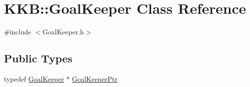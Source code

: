 \hypertarget{class_k_k_b_1_1_goal_keeper}{}\section{K\+KB\+:\+:Goal\+Keeper Class Reference}
\label{class_k_k_b_1_1_goal_keeper}


{\ttfamily \#include $<$Goal\+Keeper.\+h$>$}

\subsection*{Public Types}
\begin{DoxyCompactItemize}
\item 
typedef \hyperlink{class_k_k_b_1_1_goal_keeper}{Goal\+Keeper} $\ast$ \hyperlink{class_k_k_b_1_1_goal_keeper_a03e9ff735713903c739d1cf9734b5dda}{Goal\+Keeper\+Ptr}
\end{DoxyCompactItemize}
